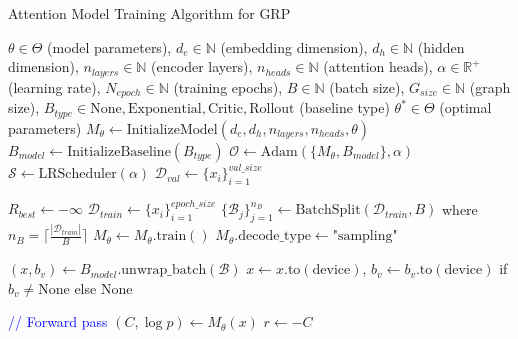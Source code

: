 \documentclass[AutoFakeBold]{LZUThesis}
\begin{document}


\begin{algorithm}[h] \begin{algorithmic}[1] \caption{Attention Model Training Algorithm for GRP} \label{alg:grp_training} \Require $\theta \in \Theta$ (model parameters), $d_e \in \mathbb{N}$ (embedding dimension), $d_h \in \mathbb{N}$ (hidden dimension), $n_{layers} \in \mathbb{N}$ (encoder layers), $n_{heads} \in \mathbb{N}$ (attention heads), $\alpha \in \mathbb{R}^{+}$ (learning rate), $N_{epoch} \in \mathbb{N}$ (training epochs), $B \in \mathbb{N}$ (batch size), $G_{size} \in \mathbb{N}$ (graph size), $B_{type} \in {\text{None}, \text{Exponential}, \text{Critic}, \text{Rollout}}$ (baseline type) \Ensure $\theta^* \in \Theta$ (optimal parameters)
		\State $M_{\theta} \leftarrow \text{InitializeModel}(d_e, d_h, n_{layers}, n_{heads}, \theta)$
		\State $B_{model} \leftarrow \text{InitializeBaseline}(B_{type})$
		\State $\mathcal{O} \leftarrow \text{Adam}(\{M_{\theta}, B_{model}\}, \alpha)$
		\State $\mathcal{S} \leftarrow \text{LRScheduler}(\alpha)$
		\State $\mathcal{D}_{val} \leftarrow \{x_i\}_{i=1}^{val\_size}$ 

		\State $R_{best} \leftarrow -\infty$ 
		\State $\mathcal{D}_{train} \leftarrow \{x_i\}_{i=1}^{epoch\_size}$ 
		\State $\{\mathcal{B}_j\}_{j=1}^{n_B} \leftarrow \text{BatchSplit}(\mathcal{D}_{train}, B)$ where $n_B = \lceil\frac{|\mathcal{D}_{train}|}{B}\rceil$
		\State $M_{\theta} \leftarrow M_{\theta}.\text{train}()$ 
		\State $M_{\theta}.\text{decode\_type} \leftarrow \text{"sampling"}$

		\State $(x, b_v) \leftarrow B_{model}.\text{unwrap\_batch}(\mathcal{B})$
		\State $x \leftarrow x.\text{to}(\text{device})$, $b_v \leftarrow b_v.\text{to}(\text{device})$ if $b_v \neq \text{None}$ else $\text{None}$

		\State \textcolor{blue}{// Forward pass}
		\State $(C, \log p) \leftarrow M_{\theta}(x)$ 
		\State $r \leftarrow -C$ 


\end{algorithmic}
\end{algorithm}
\end{document}
